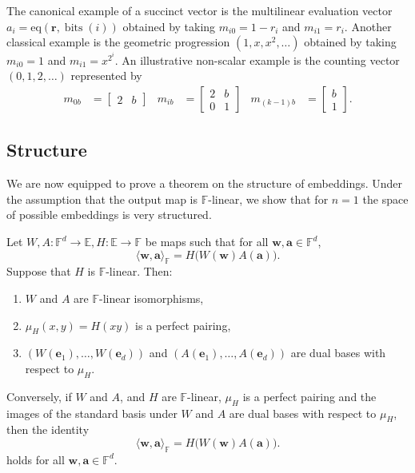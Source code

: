 The canonical example of a succinct vector is the multilinear evaluation vector $a_i = \mathrm{eq}(\mathbf{r}, \operatorname{bits}(i))$ obtained by taking $m_{i0} = 1 - r_i$ and $m_{i1} = r_i$. Another classical example is the geometric progression $(1, x, x^2, \dots)$ obtained by taking $m_{i0} = 1$ and $m_{i1} = x^{2^i}$. An illustrative non-scalar example is the counting vector $(0, 1, 2, \dots)$ represented by
\[
\begin{aligned}
m_{0b} &= \begin{bmatrix}
2 & b    
\end{bmatrix} &
m_{ib} &= \begin{bmatrix}
2 & b \\
0 &  1
\end{bmatrix} &
m_{(k-1)b} &= \begin{bmatrix}
b \\
1
\end{bmatrix}\text{.}
\end{aligned}
\]




\subsection{Structure}
We are now equipped to prove a theorem on the structure of embeddings. Under the assumption that the output map is $\mathbb{F}$-linear, we show that for $n=1$ the space of possible embeddings is very structured.

\begin{theorem}
Let $W,A:\mathbb{F}^d\rightarrow\mathbb{E}, H:\mathbb{E}\rightarrow\mathbb{F}$ be maps such that for all
$\mathbf{w},\mathbf{a}\in\mathbb{F}^d$,
\[
\langle \mathbf{w},\mathbf{a}\rangle_{\mathbb{F}}
=
H\bigl(W(\mathbf{w})A(\mathbf{a})\bigr).
\]
Suppose that $H$ is $\mathbb{F}$-linear. Then:
\begin{enumerate}
    \item $W$ and $A$ are $\mathbb{F}$-linear isomorphisms,
    \item $\mu_H(x,y) = H(xy)$ is a perfect pairing,
    \item $\left(W(\mathbf{e}_1),\ldots,W(\mathbf{e}_d)\right)$ and $\left(A(\mathbf{e}_1),\ldots,A(\mathbf{e}_d)\right)$ are dual bases with respect to $\mu_H$.
\end{enumerate}

Conversely, if $W$ and $A$, and $H$ are $\mathbb{F}$-linear, $\mu_H$ is a perfect pairing and the images of the standard basis under $W$ and $A$ are dual bases with respect to $\mu_H$, then the identity
\[
\langle \mathbf{w},\mathbf{a}\rangle_{\mathbb{F}}
=
H\bigl(W(\mathbf{w})A(\mathbf{a})\bigr).
\]
holds for all $\mathbf{w},\mathbf{a}\in\mathbb{F}^d$.
\end{theorem}

